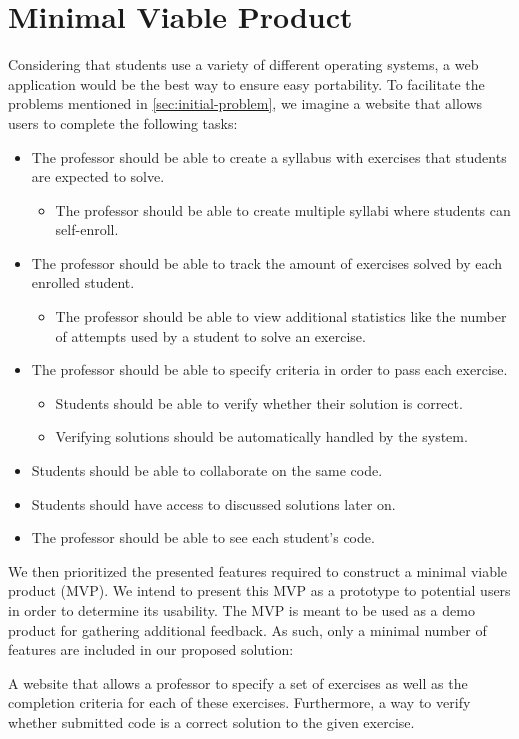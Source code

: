\section{Minimal Viable Product}
Considering that students use a variety of different operating systems, a web application would be the best way to ensure easy portability.
To facilitate the problems mentioned in \ref{sec:initial-problem}, we imagine a website that allows users to complete the following tasks:
\begin{itemize}
	\item The professor should be able to create a syllabus with exercises that students are expected to solve.
	\begin{itemize}
		\item The professor should be able to create multiple syllabi where students can self-enroll.
	\end{itemize}
	\item The professor should be able to track the amount of exercises solved by each enrolled student.
	\begin{itemize}
		\item The professor should be able to view additional statistics like the number of attempts used by a student to solve an exercise.
	\end{itemize}
	\item The professor should be able to specify criteria in order to pass each exercise.
	\begin{itemize}
		\item Students should be able to verify whether their solution is correct.
		\item Verifying solutions should be automatically handled by the system.
	\end{itemize}
	\item Students should be able to collaborate on the same code.
	\item Students should have access to discussed solutions later on.
	\item The professor should be able to see each student's code.
\end{itemize}

We then prioritized the presented features required to construct a minimal viable product (MVP).
We intend to present this MVP as a prototype to potential users in order to determine its usability.
The MVP is meant to be used as a demo product for gathering additional feedback.
As such, only a minimal number of features are included in our proposed solution:

\begin{displayquote}
A website that allows a professor to specify a set of exercises as well as the completion criteria for each of these exercises. Furthermore, a way to verify whether submitted code is a correct solution to the given exercise.
\end{displayquote}